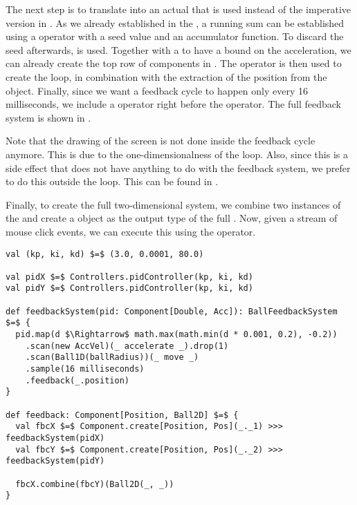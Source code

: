 The next step is to translate  into an actual  that is used instead of the imperative version in . As we already established in the , a running sum can be established using a  operator with a seed value and an accumulator function. To discard the seed afterwards,  is used. Together with a  to have a bound on the acceleration, we can already create the top row of components in . The  operator is then used to create the loop, in combination with the extraction of the position from the  object. Finally, since we want a feedback cycle to happen only every 16 milliseconds, we include a  operator right before the  operator. The full feedback system is shown in .

Note that the drawing of the screen is not done inside the feedback cycle anymore. This is due to the one-dimensionalness of the loop. Also, since this is a side effect that does not have anything to do with the feedback system, we prefer to do this outside the loop. This can be found in .

Finally, to create the full two-dimensional system, we combine two instances of the  and create a  object as the output type of the full \comp. Now, given a stream of mouse click events, we can execute this \comp using the  operator.

\begin{minipage}{\linewidth}
\begin{lstlisting}[style=ScalaStyle, caption={Ball movement feedback system}, label={lst:ball-feedback-new}]
val (kp, ki, kd) $=$ (3.0, 0.0001, 80.0)

val pidX $=$ Controllers.pidController(kp, ki, kd)
val pidY $=$ Controllers.pidController(kp, ki, kd)

def feedbackSystem(pid: Component[Double, Acc]): BallFeedbackSystem $=$ {
  pid.map(d $\Rightarrow$ math.max(math.min(d * 0.001, 0.2), -0.2))
    .scan(new AccVel)(_ accelerate _).drop(1)
    .scan(Ball1D(ballRadius))(_ move _)
    .sample(16 milliseconds)
    .feedback(_.position)
}

def feedback: Component[Position, Ball2D] $=$ {
  val fbcX $=$ Component.create[Position, Pos](_._1) >>> feedbackSystem(pidX)
  val fbcY $=$ Component.create[Position, Pos](_._2) >>> feedbackSystem(pidY)

  fbcX.combine(fbcY)(Ball2D(_, _))
}
\end{lstlisting}
\end{minipage}

